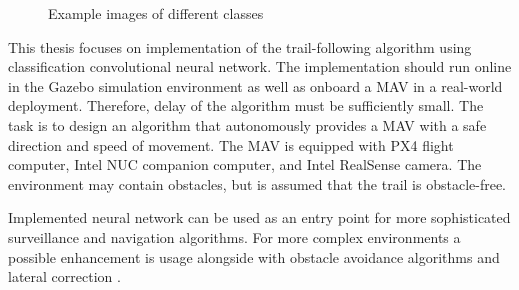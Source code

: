 \begin{figure}[!h]
\begin{minipage}{.5\linewidth}
  \end{minipage}\par\medskip
  \centering
  \caption{Example images of different classes}
  \label{fig:classes}
\end{figure}

This thesis focuses on implementation of the trail-following algorithm using classification convolutional neural network. The implementation should run online in the Gazebo simulation environment as well as onboard a MAV in a real-world deployment. Therefore, delay of the algorithm must be sufficiently small. The task is to design an algorithm that autonomously provides a MAV with a safe direction and speed of movement. The MAV is equipped with PX4 flight computer, Intel NUC companion computer, and Intel RealSense camera. The environment may contain obstacles, but is assumed that the trail is obstacle-free. 

Implemented neural network can be used as an entry point for more sophisticated surveillance and navigation algorithms. For more complex environments a possible enhancement is usage alongside with obstacle avoidance algorithms and lateral correction \cite{back2020autonomous, maciel2018extending, smolyanskiy2017toward}.















